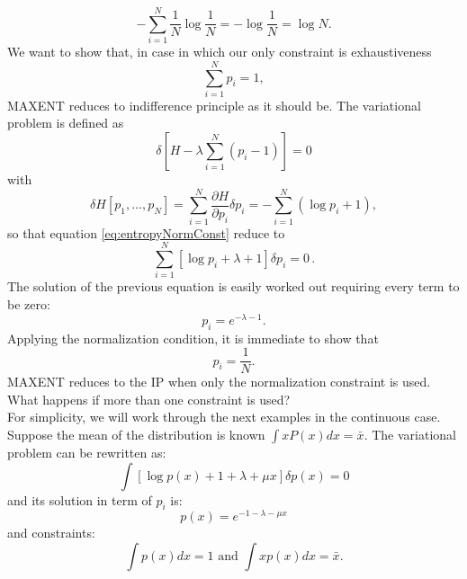 \documentclass[twocolumn,showpacs,preprintnumbers,nofootinbib,prd,
superscriptaddress,10pt]{revtex4-1}
\begin{document}
\begin{equation}
    -\sum_{i = 1}^N \frac{1}{N}\log{\frac{1}{N}} = - \log\frac{1}{N} = \log N.
\end{equation}
We want to show that, in case in which our only constraint is exhaustiveness \begin{equation}\nonumber 
    \sum_{i = 1}^{N}p_i = 1,
\end{equation}
MAXENT reduces to indifference principle as it should be. The variational problem is defined as
\begin{equation}\label{eq:entropyNormConst}
    \delta\left[H - \lambda\sum_{i = 1}^N (p_i - 1)\right] = 0 
\end{equation}
with
\begin{equation}
    \delta H\left[p_1, \dots, p_N\right] = \sum_{i = 1}^N\frac{\partial H}{\partial p_i}\delta p_i = - \sum_{i = 1}^N\left(\log p_i + 1\right),
\end{equation}
so that equation \ref{eq:entropyNormConst} reduce to
\begin{equation}\nonumber 
    \sum_{i = 1}^N\left[\log p_i + \lambda + 1 \right]\delta p_i = 0\,.
\end{equation}
The solution of the previous equation is easily worked out requiring every term to be zero: 
\begin{equation}\nonumber 
    p_i = e^{-\lambda - 1}.
\end{equation}
Applying the normalization condition, it is immediate to show that
\begin{equation}
    p_i = \frac{1}{N}.
\end{equation}
MAXENT reduces to the IP when only the normalization constraint is used. What happens if more than one constraint is used? \\
For simplicity, we will work through the next examples in the continuous case. Suppose the mean of the distribution is known $\int xP(x) dx = \bar{x}$. The variational problem can be rewritten as: 
\begin{equation}
    \int \left[\log p(x) + 1 + \lambda + \mu x \right]\delta p(x) = 0
\end{equation}
and its solution in term of $p_i$ is: 
\begin{equation}
    p(x) = e^{-1 - \lambda - \mu x} 
\end{equation}
and constraints: 
\begin{equation} \nonumber
    \int p(x) dx  = 1 \text { and }
    \int x p(x) dx = \bar x.
\end{equation}
\end{document}
